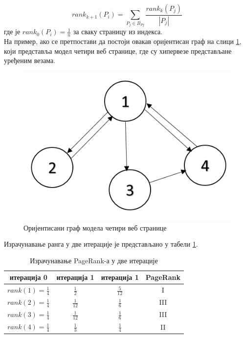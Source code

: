 \documentclass[11pt, serbianc, english, titlepage]{article}
\begin{document}
		\begin{equation}\label{eq:rank2}
		rank_{k+1}(P_{i})=\sum_{P_{j}\in B_{P{j}}}\frac{rank_{k}(P_{j})}{\left |P_{j}  \right |}
		\end{equation}
		где је $rank_{0}(P_{i})=\frac{1}{n}$ за сваку страницу из индекса.\\
		На пример, ако се претпостави да постоји овакав оријентисан граф на слици \ref{slike:graf}, који представља модел четири веб странице, где су хипервезе представљане уређеним везама. 
		\begin{figure}[here]
		\centering
		\includegraphics[scale=0.6]{graf.png}
		\caption{Оријентисани граф модела четири веб странице}
		\label{slike:graf}
		\end{figure}
		
		Израчунавање ранга у две итерације је представљано у табели \ref{tabele:rank}.
		\begin{table}[h]
		
		\centering
		\def\arraystretch{1.5}
		\begin{tabular}{|c|c|c|c|}\hline
		\textbf{итерација 0} & \textbf{итерација 1} & \textbf{итерација 1} & \textbf{PageRank}\\ \hline\hline
		$rank(1)=\frac{1}{4}$ & $\frac{1}{2}$ & $\frac{5}{12}$ & \textrm{I} \\ \hline
		$rank(2)=\frac{1}{4}$ & $\frac{1}{12}$ & $\frac{1}{6}$ & \textrm{III} \\ \hline
		$rank(3)=\frac{1}{4}$ & $\frac{1}{12}$ & $\frac{1}{6}$ & \textrm{III} \\ \hline
		$rank(4)=\frac{1}{4}$ & $\frac{1}{3}$ & $\frac{1}{4}$ &  \textrm{II}\\ \hline
		\end{tabular}
		
		\caption{Израчунавање PageRank-а у две итерације}
		\label{tabele:rank}
        \end{table}		
        \pagebreak
\end{document}
